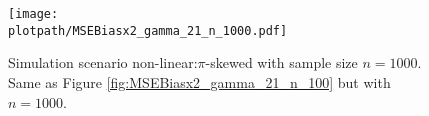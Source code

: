 \documentclass[]{imsart}
\newcommand\plotpath[1] {./#1}
\begin{document}
\begin{figure}%
\begin{center}
\texttt{[image: \\plotpath/MSEBiasx2\_gamma\_21\_n\_1000.pdf]} \\
\end{center}
\vskip-5mm
\caption{
\label{fig:MSEBiasx2gamma21_n_1000}
Simulation scenario non-linear:$\pi$-skewed with sample size $n=1000$.
Same as Figure \ref{fig:MSEBiasx2_gamma_21_n_100} but with $n=1000$.
}
\end{figure}
\FloatBarrier



\end{document}
